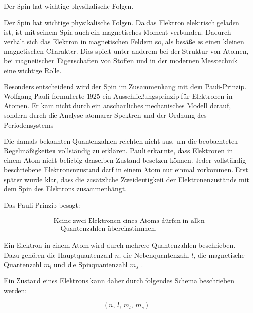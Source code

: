 Der Spin hat wichtige physikalische Folgen.

Der Spin hat wichtige physikalische Folgen. Da das Elektron elektrisch geladen
ist, ist mit seinem Spin auch ein magnetisches Moment
 verbunden. Dadurch verhält sich das Elektron in
magnetischen Feldern so, als besäße es einen kleinen
magnetischen Charakter. Dies spielt unter anderem bei der Struktur von Atomen,
bei magnetischen Eigenschaften von Stoffen und in der modernen Messtechnik eine
wichtige Rolle.

Besonders entscheidend wird der Spin im Zusammenhang mit dem
Pauli-Prinzip. Wolfgang Pauli
formulierte 1925 ein Ausschließungsprinzip für Elektronen in Atomen. Er kam
nicht durch ein anschauliches mechanisches Modell darauf, sondern durch die
Analyse atomarer Spektren und der Ordnung des
Periodensystems.

Die damals bekannten Quantenzahlen reichten nicht aus, um die beobachteten
Regelmäßigkeiten vollständig zu erklären. Pauli erkannte, dass Elektronen in
einem Atom nicht beliebig denselben Zustand besetzen können. Jeder vollständig
beschriebene Elektronenzustand darf in einem Atom nur einmal vorkommen. Erst
später wurde klar, dass die zusätzliche Zweideutigkeit der Elektronenzustände
mit dem Spin des Elektrons zusammenhängt.

Das Pauli-Prinzip besagt:

\begin{equation}
	\begin{aligned}
		&\text{Keine zwei Elektronen eines Atoms dürfen in allen} \\
		&\quad \text{Quantenzahlen übereinstimmen.}
	\end{aligned}
	\label{eq:pauli_prinzip_text}
\end{equation}

Ein Elektron in einem Atom wird durch mehrere Quantenzahlen
beschrieben. Dazu gehören die Hauptquantenzahl \(n\),
die Nebenquantenzahl \(l\), die magnetische Quantenzahl
\(m_l\) und die Spinquantenzahl \(m_s\)
.

Ein Zustand eines Elektrons kann daher durch folgendes Schema beschrieben
werden:

\begin{equation}
	(n,\, l,\, m_l,\, m_s)
	\label{eq:quantenzahlen_elektron_zustand}
\end{equation}

